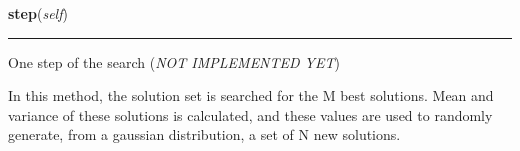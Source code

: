     \vspace{0.5ex}

\hspace{.8\funcindent}\begin{boxedminipage}{\funcwidth}

    \raggedright \textbf{step}(\textit{self})

    \vspace{-1.5ex}

    \rule{\textwidth}{0.5\fboxrule}
\setlength{\parskip}{2ex}

One step of the search (\emph{NOT IMPLEMENTED YET})

In this method, the solution set is searched for the M best solutions.
Mean and variance of these solutions is calculated, and these values are
used to randomly generate, from a gaussian distribution, a set of N new
solutions.
\setlength{\parskip}{1ex}
    \end{boxedminipage}

